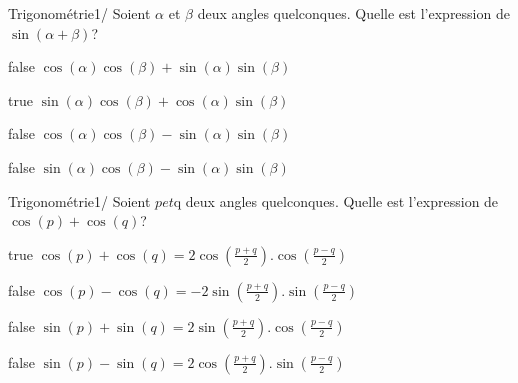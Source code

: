             \begin{question}{47}{Trigonométrie}{1}{/}
				Soient $\alpha$ et $\beta$ deux angles quelconques. Quelle est l'expression de $\sin(\alpha+\beta)$?
            \end{question}
            \begin{reponses}
            	\item[false] $\cos(\alpha)\cos(\beta)+\sin(\alpha)\sin(\beta)$
            	\item[true] $\sin(\alpha)\cos(\beta)+\cos(\alpha)\sin(\beta)$
                \item[false] $\cos(\alpha)\cos(\beta)-\sin(\alpha)\sin(\beta)$
                \item[false] $\sin(\alpha)\cos(\beta)-\sin(\alpha)\sin(\beta)$
            \end{reponses}
			\begin{question}{47}{Trigonométrie}{1}{/}
				Soient $p et $q deux angles quelconques. Quelle est l'expression de $\cos(p)+\cos(q)$?
            \end{question}
            \begin{reponses}
            	\item[true] $\cos(p) + \cos(q) = 2\cos(\frac{p+q}{2}).\cos(\frac{p-q}{2})$
            	\item[false] $\cos(p) - \cos(q) = -2\sin(\frac{p+q}{2}).\sin(\frac{p-q}{2})$
                \item[false] $\sin(p) + \sin(q) = 2\sin(\frac{p+q}{2}).\cos(\frac{p-q}{2})$
                \item[false] $\sin(p) - \sin(q) = 2\cos(\frac{p+q}{2}).\sin(\frac{p-q}{2}) $
            \end{reponses}
